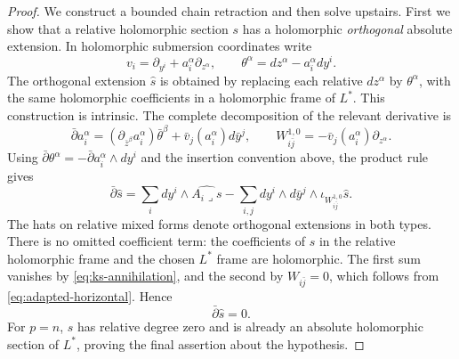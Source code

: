 \documentclass[11pt,reqno]{amsart}
\numberwithin{equation}{section}
\theoremstyle{definition}
\theoremstyle{remark}
\newcommand{\db}{\bar\partial}
\begin{document}
\begin{proof}
We construct a bounded chain retraction and then solve upstairs. First we show that a relative holomorphic section $s$ has a holomorphic \emph{orthogonal} absolute extension. In holomorphic submersion coordinates write
\[
 v_i=\partial_{y^i}+a_i^\alpha\partial_{z^\alpha},
 \qquad \theta^\alpha=dz^\alpha-a_i^\alpha dy^i.
\]
The orthogonal extension $\widehat s$ is obtained by replacing each relative $dz^\alpha$ by $\theta^\alpha$, with the same holomorphic coefficients in a holomorphic frame of $L^*$. This construction is intrinsic. The complete decomposition of the relevant derivative is
\[
 \db a_i^\alpha
   =(\partial_{\bar z^\beta}a_i^\alpha)\bar\theta^\beta
                 +\bar v_j(a_i^\alpha)d\bar y^j,
 \qquad
 W_{i\bar j}^{1,0}=-\bar v_j(a_i^\alpha)\partial_{z^\alpha}.
\]
Using $\db\theta^\alpha=-\db a_i^\alpha\wedge dy^i$ and the insertion convention above, the product rule gives
\begin{equation}\label{eq:orthogonal-extension-obstruction}
 \db\widehat s
  =\sum_i dy^i\wedge\widehat{A_i\lrcorner s}
       -\sum_{i,j}dy^i\wedge d\bar y^j
               \wedge\iota_{W_{i\bar j}^{1,0}}\widehat s.
\end{equation}
The hats on relative mixed forms denote orthogonal extensions in both types. There is no omitted coefficient term: the coefficients of $s$ in the relative holomorphic frame and the chosen $L^*$ frame are holomorphic. The first sum vanishes by \eqref{eq:ks-annihilation}, and the second by $W_{i\bar j}=0$, which follows from \eqref{eq:adapted-horizontal}. Hence
\begin{equation}\label{eq:holomorphic-orthogonal-extension}
              \db\widehat s=0.
\end{equation}
For $p=n$, $s$ has relative degree zero and is already an absolute holomorphic section of $L^*$, proving the final assertion about the hypothesis.


\end{proof}
\end{document}
